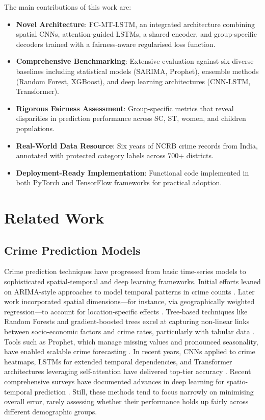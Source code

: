 \documentclass{svproc}
\newcommand{\modelname}{FC-MT-LSTM}
\begin{document}
The main contributions of this work are:
\begin{itemize}
\item \textbf{Novel Architecture}: \modelname{}, an integrated architecture combining spatial CNNs, attention-guided LSTMs, a shared encoder, and group-specific decoders trained with a fairness-aware regularised loss function.
\item \textbf{Comprehensive Benchmarking}: Extensive evaluation against six diverse baselines including statistical models (SARIMA, Prophet), ensemble methods (Random Forest, XGBoost), and deep learning architectures (CNN-LSTM, Transformer).
\item \textbf{Rigorous Fairness Assessment}: Group-specific metrics that reveal disparities in prediction performance across SC, ST, women, and children populations.
\item \textbf{Real-World Data Resource}: Six years of NCRB crime records from India, annotated with protected category labels across 700+ districts.
\item \textbf{Deployment-Ready Implementation}: Functional code implemented in both PyTorch and TensorFlow frameworks for practical adoption.
\end{itemize}

\section{Related Work}

\subsection{Crime Prediction Models}

Crime prediction techniques have progressed from basic time-series models to sophisticated spatial-temporal and deep learning frameworks. Initial efforts leaned on ARIMA-style approaches to model temporal patterns in crime counts \cite{box2015time}. Later work incorporated spatial dimensions—for instance, via geographically weighted regression—to account for location-specific effects \cite{anselin2000spatial}. Tree-based techniques like Random Forests and gradient-boosted trees excel at capturing non-linear links between socio-economic factors and crime rates, particularly with tabular data \cite{breiman2001random,chen2016xgboost}. Tools such as Prophet, which manage missing values and pronounced seasonality, have enabled scalable crime forecasting \cite{taylor2018forecasting}. In recent years, CNNs applied to crime heatmaps, LSTMs for extended temporal dependencies, and Transformer architectures leveraging self-attention have delivered top-tier accuracy \cite{huang2018deepcrime,hochreiter1997long,vaswani2017attention}. Recent comprehensive surveys have documented advances in deep learning for spatio-temporal prediction \cite{zhang2024deep,singh2022deep}. Still, these methods tend to focus narrowly on minimising overall error, rarely assessing whether their performance holds up fairly across different demographic groups.
\end{document}
